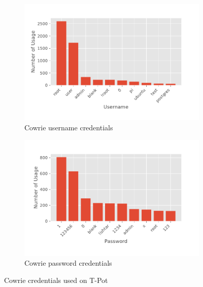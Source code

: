 \begin{figure}
    \centering

    \begin{subfigure}[b]{0.49\textwidth}
        \centering
        \includegraphics[width=\textwidth]{figures/tpot-cowrie-username.pdf}
        \caption{Cowrie username credentials}
        \label{fig:tpot-cowrie-username}
    \end{subfigure}
    \hfill
    \begin{subfigure}[b]{0.49\textwidth}
        \centering
        \includegraphics[width=\textwidth]{figures/tpot-cowrie-password.pdf}
        \caption{Cowrie password credentials}
        \label{fig:tpot-cowrie-password}
    \end{subfigure}
    \caption[Cowrie credentials on T-Pot]{Cowrie credentials used on T-Pot}
    \label{fig:cowrie-credentials}
\end{figure}

